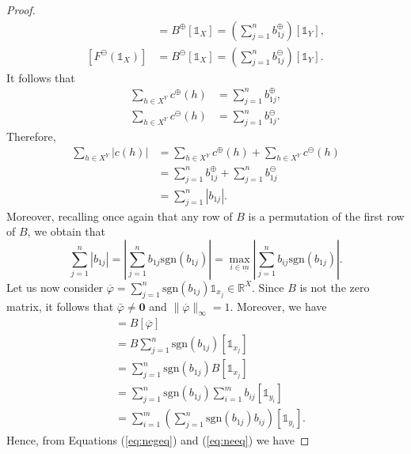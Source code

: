 \documentclass[11pt]{article}
\newcommand{\R}{\mathbb{R}}
\newcommand{\p}{\varphi}
\begin{document}
\begin{proof}
    \begin{align*}
    [F^\oplus(\mathds{1}_X)] & = B^\oplus [\mathds{1}_X] = \left( \sum_{j=1}^n b^\oplus_{1j}\right) [\mathds{1}_Y]
    , \\
    [F^\ominus(\mathds{1}_X)] & = B^\ominus [\mathds{1}_X] = \left( \sum_{j=1}^n b^\ominus_{1j}\right) [\mathds{1}_Y].
    \end{align*}
    It follows that
    \begin{align*}
    \sum_{h\in X^Y}c^\oplus(h) & = \sum_{j=1}^n b^\oplus_{1j}
    , \\
    \sum_{h\in X^Y}c^\ominus(h) & = \sum_{j=1}^n b^\ominus_{1j}.
    \end{align*}
Therefore,
    \begin{align}
    \label{eq:neeq}
    \sum_{h \in X^Y} \left| c(h) \right| & = \sum_{h \in X^Y} c^\oplus(h) + \sum _{h \in X^Y} c^\ominus(h) \nonumber \\
    & = \sum_{j=1}^n b^\oplus_{1j} + \sum_{j=1}^n b^\ominus_{1j} \nonumber \\
    & = \sum_{j=1}^n \left| b_{1j} \right|.
    \end{align}
{\color{black} Moreover, recalling once again that any row of $B$ is a permutation of the first
row of $B$,} we obtain that 
    \[
    \sum_{j=1}^n \left| b_{1j} \right| = \left| \sum_{j=1}^n b_{1j} \mathrm{sgn}(b_{1j}) \right| = \max_{i\in\underline{m}} \left| \sum_{j=1}^n b_{ij} \mathrm{sgn}(b_{1j}) \right|.
    \]
    Let us now consider $\overline{\varphi} = \sum^n_{j=1}\mathrm{sgn}(b_{1j})\mathds{1}_{x_j} \in \R^X$. Since \(B\) is not the zero matrix, it follows that $\bar \p \neq\mathbf{0}$ and $\lVert \overline{\varphi} \rVert_\infty = 1$. Moreover, we have
    \begin{align*}
        [F (\overline{\varphi})] & = B [\overline{\varphi}] \\
        & = B \sum^n_{j=1}\mathrm{sgn}(b_{1j})[\mathds{1}_{x_j}] \\
        & = \sum^n_{j=1}\mathrm{sgn}(b_{1j})B[\mathds{1}_{x_j}] \\
        & = \sum^n_{j=1}\mathrm{sgn}(b_{1j})\sum^m_{i=1}b_{ij}[\mathds{1}_{y_i}] \\
        & = \sum^m_{i=1}\left(\sum^n_{j=1}\mathrm{sgn}(b_{1j})b_{ij}\right)[\mathds{1}_{y_i}].
    \end{align*} 
    Hence, from Equations (\ref{eq:negeq}) and (\ref{eq:neeq}) we have 

\end{proof}
\end{document}
